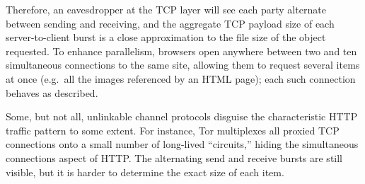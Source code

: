 \documentclass{zarticle}
\begin{document}
Therefore, an eavesdropper at the TCP layer will see each party
alternate between sending and receiving, and the aggregate TCP payload
size of each server-to-client burst is a close approximation to the
file size of the object requested.  To enhance parallelism, browsers
open anywhere between two and ten simultaneous connections to the same
site, allowing them to request several items at once (e.g.\ all the
images referenced by an HTML page); each such connection behaves as
described.

Some, but not all, unlinkable channel protocols disguise the
characteristic HTTP traffic pattern to some extent.  For instance, Tor
multiplexes all proxied TCP connections onto a small number of
long-lived “circuits,” hiding the simultaneous connections aspect of
HTTP.  The alternating send and receive bursts are still visible, but
it is harder to determine the exact size of each item.




\end{document}
